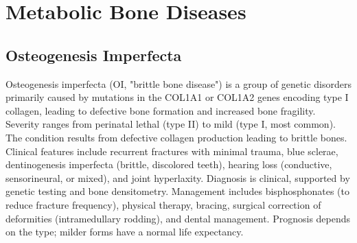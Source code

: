 \section{Metabolic Bone Diseases}








\label{sec:Metabolic Bone Diseases}

\subsection{Osteogenesis Imperfecta}
\label{sec:Osteogenesis Imperfecta}
Osteogenesis imperfecta (OI, "brittle bone disease") is a group of genetic disorders primarily caused by mutations in the COL1A1 or COL1A2 genes encoding type I collagen, leading to defective bone formation and increased bone fragility. Severity ranges from perinatal lethal (type II) to mild (type I, most common). The condition results from defective collagen production leading to brittle bones. Clinical features include recurrent fractures with minimal trauma, blue sclerae, dentinogenesis imperfecta (brittle, discolored teeth), hearing loss (conductive, sensorineural, or mixed), and joint hyperlaxity. Diagnosis is clinical, supported by genetic testing and bone densitometry. Management includes bisphosphonates (to reduce fracture frequency), physical therapy, bracing, surgical correction of deformities (intramedullary rodding), and dental management. Prognosis depends on the type; milder forms have a normal life expectancy.

